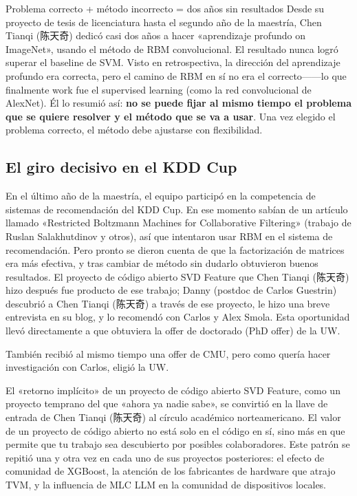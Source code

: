 \begin{warningbox}{Problema correcto + método incorrecto = dos años sin resultados}
Desde su proyecto de tesis de licenciatura hasta el segundo año de la maestría, Chen Tianqi (陈天奇) dedicó casi dos años a hacer «aprendizaje profundo on ImageNet», usando el método de RBM convolucional. El resultado nunca logró superar el baseline de SVM. Visto en retrospectiva, la dirección del aprendizaje profundo era correcta, pero el camino de RBM en sí no era el correcto------lo que finalmente work fue el supervised learning (como la red convolucional de AlexNet). Él lo resumió así: \textbf{no se puede fijar al mismo tiempo el problema que se quiere resolver y el método que se va a usar}. Una vez elegido el problema correcto, el método debe ajustarse con flexibilidad.
\end{warningbox}

\subsection{El giro decisivo en el KDD Cup}

En el último año de la maestría, el equipo participó en la competencia de sistemas de recomendación del KDD Cup. En ese momento sabían de un artículo llamado «Restricted Boltzmann Machines for Collaborative Filtering» (trabajo de Ruslan Salakhutdinov y otros), así que intentaron usar RBM en el sistema de recomendación. Pero pronto se dieron cuenta de que la factorización de matrices era más efectiva, y tras cambiar de método sin dudarlo obtuvieron buenos resultados. El proyecto de código abierto SVD Feature que Chen Tianqi (陈天奇) hizo después fue producto de ese trabajo; Danny (postdoc de Carlos Guestrin) descubrió a Chen Tianqi (陈天奇) a través de ese proyecto, le hizo una breve entrevista en su blog, y lo recomendó con Carlos y Alex Smola. Esta oportunidad llevó directamente a que obtuviera la offer de doctorado (PhD offer) de la UW.

También recibió al mismo tiempo una offer de CMU, pero como quería hacer investigación con Carlos, eligió la UW.

\begin{knowledgebox}{El «retorno implícito» de un proyecto de código abierto}
SVD Feature, como un proyecto temprano del que «ahora ya nadie sabe», se convirtió en la llave de entrada de Chen Tianqi (陈天奇) al círculo académico norteamericano. El valor de un proyecto de código abierto no está solo en el código en sí, sino más en que permite que tu trabajo sea descubierto por posibles colaboradores. Este patrón se repitió una y otra vez en cada uno de sus proyectos posteriores: el efecto de comunidad de XGBoost, la atención de los fabricantes de hardware que atrajo TVM, y la influencia de MLC LLM en la comunidad de dispositivos locales.
\end{knowledgebox}

